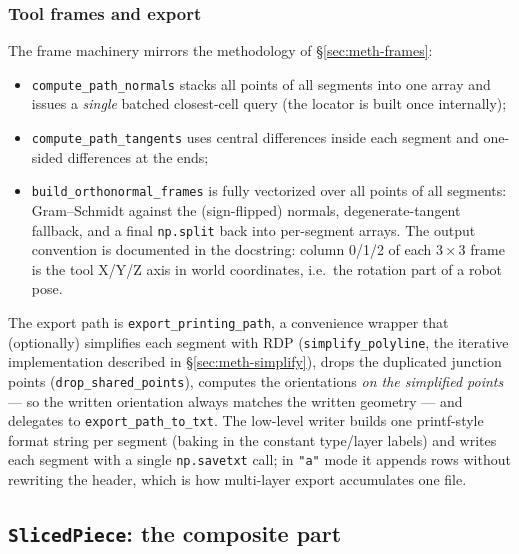 \subsubsection{Tool frames and export}

The frame machinery mirrors the methodology of
\S\ref{sec:meth-frames}:
\begin{itemize}
  \item \texttt{compute\_path\_normals} stacks all points of all
        segments into one array and issues a \emph{single} batched
        closest-cell query (the locator is built once internally);
  \item \texttt{compute\_path\_tangents} uses central differences
        inside each segment and one-sided differences at the ends;
  \item \texttt{build\_orthonormal\_frames} is fully vectorized over
        all points of all segments: Gram--Schmidt against the
        (sign-flipped) normals, degenerate-tangent fallback, and a
        final \texttt{np.split} back into per-segment arrays. The
        output convention is documented in the docstring: column 0/1/2
        of each $3\times3$ frame is the tool X/Y/Z axis in world
        coordinates, i.e.\ the rotation part of a robot pose.
\end{itemize}

The export path is \texttt{export\_printing\_path}, a convenience
wrapper that (optionally) simplifies each segment with RDP
(\texttt{simplify\_polyline}, the iterative implementation described in
\S\ref{sec:meth-simplify}), drops the duplicated junction points
(\texttt{drop\_shared\_points}), computes the orientations \emph{on the
simplified points} --- so the written orientation always matches the
written geometry --- and delegates to \texttt{export\_path\_to\_txt}.
The low-level writer builds one printf-style format string per segment
(baking in the constant type/layer labels) and writes each segment with
a single \texttt{np.savetxt} call; in \texttt{"a"} mode it appends
rows without rewriting the header, which is how multi-layer export
accumulates one file.

\subsection{\texttt{SlicedPiece}: the composite part}\label{sec:impl-piece}

